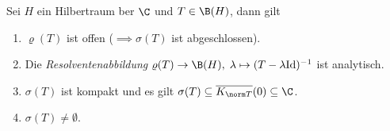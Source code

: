 	\begin{theorem}
		Sei $H$ ein Hilbertraum \us ber $\C$ und \(T\in \B(H)\), dann gilt
		\label{Spektren}
		\begin{enumerate}
			\item \label{Spektren_1}\(\varrho(T)\) ist offen (\(\implies \sigma(T)\) ist abgeschlossen).
			\item \label{Spektren_2}Die \textit{Resolventenabbildung} \(\varrho(T) \to \B(H),\;\lambda \mapsto (T-\lambda \text{Id})^{-1}\) ist analytisch.
			\item \label{Spektren_3}\(\sigma(T)\) ist kompakt und es gilt \(\sigma(T) \subseteq \overline{K_{\norm T}}(0) \subseteq \C\).
			\item \label{Spektren_4}\(\sigma(T) \neq \emptyset\).
		\end{enumerate}
	\end{theorem}
	
